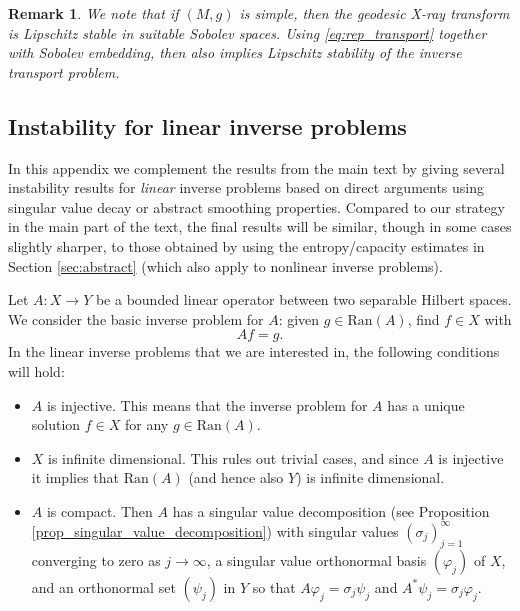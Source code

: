 \documentclass[12pt,twoside]{amsart}
\numberwithin{equation}{section}
\newtheorem{remark}[theorem]{Remark}
\begin{document}
\begin{remark}
\label{rmk:stable_simple}
We note that if $(M,g)$ is simple, then the geodesic X-ray transform is Lipschitz stable in suitable Sobolev spaces. Using \eqref{eq:rep_transport} together with Sobolev embedding, then also implies Lipschitz stability of the inverse transport problem.
\end{remark}



\begin{appendix}



\section{Instability for linear inverse problems}
\label{sec:abstr}




In this appendix we complement the results from the main text by giving several instability results for \emph{linear} inverse problems based on direct arguments using singular value decay or abstract smoothing properties. Compared to our strategy in the main part of the text, the final results will be similar, though in some cases slightly sharper, to those obtained by using the entropy/capacity estimates in Section \ref{sec:abstract} (which also apply to nonlinear inverse problems).

Let $A: X \to Y$ be a bounded linear operator between two separable Hilbert spaces. We consider the basic inverse problem for $A$: given $g \in \mathrm{Ran}(A)$, find $f \in X$ with 
\[
Af = g.
\]
In the linear inverse problems that we are interested in, the following conditions will hold:
\begin{itemize}
\item 
$A$ is injective. This means that the inverse problem for $A$ has a unique solution $f \in X$ for any $g \in \mathrm{Ran}(A)$.
\item 
$X$ is infinite dimensional. This rules out trivial cases, and since $A$ is injective it implies that $\mathrm{Ran}(A)$ (and hence also $Y$) is infinite dimensional.
\item 
$A$ is compact. Then $A$ has a singular value decomposition (see Proposition \ref{prop_singular_value_decomposition}) with singular values $(\sigma_j)_{j=1}^{\infty}$ converging to zero as $j \to \infty$, a singular value orthonormal basis $(\varphi_j)$ of $X$, and an orthonormal set $(\psi_j)$ in $Y$ so that $A\varphi_j = \sigma_j \psi_j$ and $A^* \psi_j = \sigma_j \varphi_j$.
\end{itemize}


\end{appendix}
\end{document}
